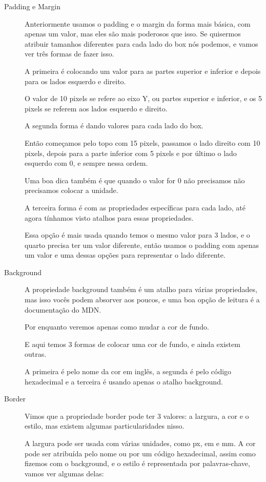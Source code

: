 \documentclass[12pt,a4paper]{article}
\begin{document}
	\begin{description}
		\item[Padding e Margin] Anteriormente usamos o padding e o margin da forma mais básica, com apenas um valor, mas eles são mais poderosos que isso. Se quisermos atribuir tamanhos diferentes para cada lado do box nós podemos, e vamos ver três formas de fazer isso.
		
		A primeira é colocando um valor para as partes superior e inferior e depois para os lados esquerdo e direito.
		
		O valor de 10 pixels se refere ao eixo Y, ou partes superior e inferior, e os 5 pixels se referem aos lados esquerdo e direito.
		
		A segunda forma é dando valores para cada lado do box.
		
		Então começamos pelo topo com 15 pixels, passamos o lado direito com 10 pixels, depois para a parte inferior com 5 pixels e por último o lado esquerdo com 0, e sempre nessa ordem.
		
		Uma boa dica também é que quando o valor for 0 não precisamos não precisamos colocar a unidade.
		
		A terceira forma é com as propriedades específicas para cada lado, até agora tínhamos visto atalhos para essas propriedades.
		
		Essa opção é mais usada quando temos o mesmo valor para 3 lados, e o quarto precisa ter um valor diferente, então usamos o padding com apenas um valor e uma dessas opções para representar o lado diferente.
		
		\item[Background] A propriedade background também é um atalho para várias propriedades, mas isso vocês podem absorver aos poucos, e uma boa opção de leitura é a documentação do MDN.
		
		Por enquanto veremos apenas como mudar a cor de fundo.
		
		E aqui temos 3 formas de colocar uma cor de fundo, e ainda existem outras.
		
		A primeira é pelo nome da cor em inglês, a segunda é pelo código hexadecimal e a terceira é usando apenas o atalho background.
		
		\item[Border] Vimos que a propriedade border pode ter 3 valores: a largura, a cor e o estilo, mas existem algumas particularidades nisso.
		
		A largura pode ser usada com várias unidades, como px, em e mm. A cor pode ser atribuída pelo nome ou por um código hexadecimal, assim como fizemos com o background, e o estilo é representada por palavras-chave, vamos ver algumas delas:
		

\end{description}
\end{document}
